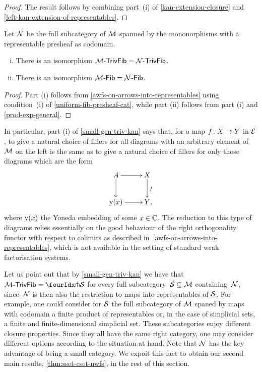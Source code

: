 \documentclass[reqno,10pt,a4paper,oneside,draft]{amsart}
\begin{document}
\begin{proof}
The result follows by combining part~(i) of \cref{kan-extension-closure} and \cref{left-kan-extension-of-representables}.
\end{proof}

\begin{lemma} \label{small-gen-triv-kan}
Let $\cal{N}$ be the full subcategory of $\cal{M}$ spanned by the mononorphisms with a representable presheaf as codomain.
\begin{enumerate}[(i)]
\item There is an isomorphism $\TrivFib{\cal{M}} = \TrivFib{\cal{N}}$.
\item There is an isomorphism $\Fib{\cal{M}} = \Fib{\cal{N}}$.
\end{enumerate}
\end{lemma}

\begin{proof}
Part (i) follows from \cref{awfs-on-arrows-into-representables} using condition~(i) of \cref{uniform-fib-presheaf-cat}, while part (ii) follows from part (i) and \cref{prod-exp-general}.
\end{proof}

In particular, part (i) of \cref{small-gen-triv-kan} says that, for a map $f \co X \to Y$ in $\catE$, to give a natural choice of fillers for all diagrams with an arbitrary element of $\cal{M}$ on the left is the same as to give a natural choice of fillers for only those diagrams which are  the form
\[
\xymatrix{
  A
  \ar[r]
  \ar[d]
&
  X
  \ar[d]^f
\\
  \yon(x)
  \ar[r]
&
  Y
\rlap{,}}
\]
where $\yon(x)$ the Yoneda embedding of some $x \in \catC$.
The reduction to this type of diagrams relies essentially on the good behaviour of the right orthogonality functor with respect to colimits as described in~\cref{awfs-on-arrows-into-representables}, which is not available in the setting of standard
weak factorisation systems.

\begin{remark}
Let us point out that by \cref{small-gen-triv-kan} we have that $\TrivFib{\cal{M}} = \liftr{\cal{S}}$ for every full subcategory~$\cal{S} \subseteq \cal{M}$ containing~$\cal{N}$, since~$\cal{N}$ is then also the restriction to maps into representables of $\cal{S}$.
For example, one could consider for $\cal{S}$ the full subcategory of $\cal{M}$ spaned by maps with codomain a finite product of representables or, in the case of simplicial sets, a finite and finite-dimensional simplicial set.
These subcategories enjoy different closure properties.
Since they all have the same right category, one may consider different options according to the situation at hand.
Note that $\cal{N}$ has the key advantage of being a small category.
We expoit this fact to obtain our second main results, \cref{thm:sset-cset-nwfs}, in the rest of this section.
\end{remark}
\end{document}
